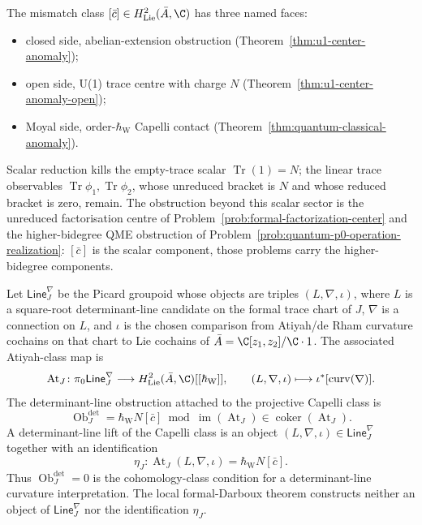 \documentclass[11pt]{memoir}
\begin{document}
\begin{rmk}\label{rmk:three-faces-one-class}
  The mismatch class $[\bar c]\in H^2_{\mathrm{Lie}}(\bar A,\C)$ has
  three named faces:
  \begin{itemize}
    \item closed side, abelian-extension obstruction
      (Theorem~\ref{thm:u1-center-anomaly});
    \item open side, U(1) trace centre with charge $N$
      (Theorem~\ref{thm:u1-center-anomaly-open});
    \item Moyal side, order-$\hbar_{\mathrm{W}}$ Capelli contact
      (Theorem~\ref{thm:quantum-classical-anomaly}).
  \end{itemize}
  Scalar reduction kills the empty-trace scalar
  $\operatorname{Tr}(1)=N$; the linear trace
  observables $\operatorname{Tr}\phi_1,\operatorname{Tr}\phi_2$, whose
  unreduced bracket is $N$ and whose reduced bracket is zero, remain.  The
  obstruction beyond this scalar sector is the unreduced
  factorisation centre of Problem~\ref{prob:formal-factorization-center}
  and the higher-bidegree QME obstruction of
  Problem~\ref{prob:quantum-p0-operation-realization}: \([\bar c]\) is
  the scalar component, those problems carry the higher-bidegree
  components.
\end{rmk}

\begin{defn}
\label{defn:capelli-determinant-line-obstruction}
Let \(\mathsf{Line}^{\nabla}_J\) be the Picard groupoid whose objects are
triples \((L,\nabla,\iota)\), where \(L\) is a square-root
determinant-line candidate on the formal trace chart of \(J\),
\(\nabla\) is a connection on \(L\), and \(\iota\) is the chosen
comparison from Atiyah/de Rham curvature cochains on that chart to
Lie cochains of \(\bar A=\C[z_1,z_2]/\C\cdot1\).  The associated
Atiyah-class map is
\[
  \operatorname{At}_J\colon
  \pi_0\mathsf{Line}^{\nabla}_J
  \longrightarrow
  H^2_{\mathrm{Lie}}(\bar A,\C)[[\hbar_{\mathrm{W}}]],
  \qquad
  (L,\nabla,\iota)\longmapsto
  \iota^*[\operatorname{curv}(\nabla)] .
\]
The determinant-line obstruction attached to the projective Capelli
class is
\[
  \operatorname{Ob}^{\det}_J
  =
  \hbar_{\mathrm{W}}N[\bar c]
  \bmod \operatorname{im}(\operatorname{At}_J)
  \in
  \operatorname{coker}(\operatorname{At}_J).
\]
A determinant-line lift of the Capelli class is an object
\((L,\nabla,\iota)\in\mathsf{Line}^{\nabla}_J\) together with an
identification
\[
  \eta_J\colon
  \operatorname{At}_J(L,\nabla,\iota)
  =
  \hbar_{\mathrm{W}}N[\bar c].
\]
Thus \(\operatorname{Ob}^{\det}_J=0\) is the cohomology-class condition
for a determinant-line curvature interpretation.  The local
formal-Darboux theorem constructs neither an object of
\(\mathsf{Line}^{\nabla}_J\) nor the identification \(\eta_J\).
\end{defn}
\end{document}
